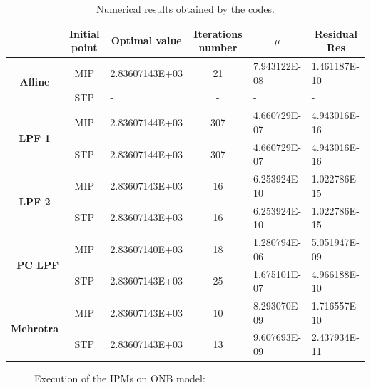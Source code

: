 \documentclass[a4paper,10 pt,titlepage,twoside]{report}
\theoremstyle{plain}
\theoremstyle{definition}
\theoremstyle{remark}
\begin{document}
{{\begin{table}[]\caption{\label{table:ONB}Numerical results obtained by the codes.}
	\begin{tabular}{cclcll}
		\hline		\textbf{} & \textbf{Initial point} & \multicolumn{1}{c}{\textbf{Optimal value}} & \textbf{Iterations number} & \multicolumn{1}{c}{\textbf{$\mu$}} & \multicolumn{1}{c}{\textbf{Residual} Res} \\ \hline
		\multicolumn{1}{c|}{\multirow{2}{*}{\textbf{Affine}}} & MIP & 2.83607143E+03 & 21 & 7.943122E-08 & 1.461187E-10 \\
		\multicolumn{1}{c|}{} & STP & - & - & - & - \\ \hline
		\multicolumn{1}{c|}{\multirow{2}{*}{\textbf{LPF 1}}} & MIP & 2.83607144E+03 & 307 & 4.660729E-07 & 4.943016E-16 \\
		\multicolumn{1}{c|}{} & STP & 2.83607144E+03 & 307 & 4.660729E-07 & 4.943016E-16 \\ \hline
		\multicolumn{1}{c|}{\multirow{2}{*}{\textbf{LPF 2}}} & MIP & 2.83607143E+03 & 16 & 6.253924E-10 & 1.022786E-15 \\
		\multicolumn{1}{c|}{} & STP & 2.83607143E+03 & 16 & 6.253924E-10 & 1.022786E-15 \\ \hline
		\multicolumn{1}{r|}{\multirow{2}{*}{\textbf{PC LPF}}} & MIP & 2.83607140E+03 & 18 & 1.280794E-06 & 5.051947E-09 \\
		\multicolumn{1}{r|}{} & STP & 2.83607143E+03 & 25 & 1.675101E-07 & 4.966188E-10 \\ \hline
		\multicolumn{1}{c|}{\multirow{2}{*}{\textbf{Mehrotra}}} & MIP & 2.83607143E+03 & 10 & 8.293070E-09 & 1.716557E-10 \\
		\multicolumn{1}{c|}{} & STP & 2.83607143E+03  & 13 & 9.607693E-09 & 2.437934E-11 \\ \hline
	\end{tabular}
\end{table}
\begin{figure}\caption{\label{figure:onb}Execution of the IPMs on ONB model:}
	 \qquad%

\end{figure}}}
\end{document}
